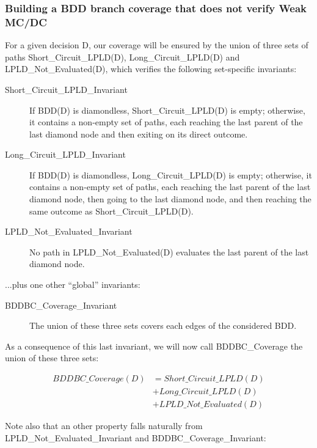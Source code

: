 \documentclass[a4paper,12pt,twoside]{article}
\begin{document}
\subsubsection{Building a BDD branch coverage that does not verify Weak MC/DC}

For a given decision D, our coverage will be ensured by the union of
three sets of paths Short\_Circuit\_LPLD(D), Long\_Circuit\_LPLD(D) and
LPLD\_Not\_Evaluated(D), which verifies the following set-specific
invariants:

\begin{description}
\item[Short\_Circuit\_LPLD\_Invariant]
  If BDD(D) is diamondless, Short\_Circuit\_LPLD(D) is empty;
  otherwise, it contains a non-empty set of paths, each reaching the
  last parent of the last diamond node and then exiting on its direct
  outcome.

\item[Long\_Circuit\_LPLD\_Invariant]
  If BDD(D) is diamondless, Long\_Circuit\_LPLD(D) is empty;
  otherwise, it contains a non-empty set of paths, each reaching the last
  parent of the last diamond node, then going to the last diamond node, and
  then reaching the same outcome as Short\_Circuit\_LPLD(D).

\item[LPLD\_Not\_Evaluated\_Invariant]
  No path in LPLD\_Not\_Evaluated(D) evaluates the last parent of the last
  diamond node.
\end{description}

...plus one other ``global'' invariants:

\begin{description}
\item[BDDBC\_Coverage\_Invariant]
 The union of these three sets covers each edges of the considered
 BDD.
\end{description}

As a consequence of this last invariant, we will now call
BDDBC\_Coverage the union of these three sets:

\begin{align*}
  BDDBC\_Coverage(D) & = Short\_Circuit\_LPLD(D)\\
                     & + Long\_Circuit\_LPLD(D)\\
                     & + LPLD\_Not\_Evaluated(D)
\end{align*}

Note also that an other property falls naturally from
LPLD\_Not\_Evaluated\_Invariant and BDDBC\_Coverage\_Invariant:
\end{document}
